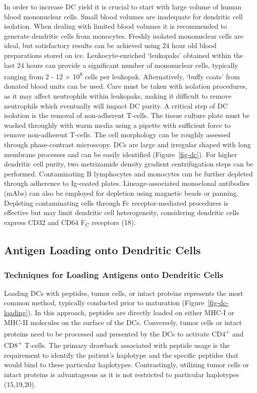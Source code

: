 \documentclass[
]{article}
\begin{document}
In order to increase DC yield it is crucial to start with large volume
of human blood mononuclear cells. Small blood volumes are inadequate for
dendritic cell isolation. When dealing with limited blood volumes it is
recommended to generate dendritic cells from monocytes. Freshly isolated
mononuclear cells are ideal, but satisfactory results can be achieved
using 24 hour old blood preparations stored on ice. Leukocyte-enriched
`leukopaks' obtained within the last 24 hours can provide a significant
number of mononuclear cells, typically ranging from 2 - 12 ×
10\textsuperscript{8} cells per leukopak. Alternatively, `buffy coats'
from donated blood units can be used. Care must be taken with isolation
procedures, as it may affect neutrophils within leukopaks, making it
difficult to remove neutrophils which eventually will impact DC purity.
A critical step of DC isolation is the removal of non-adherent T-cells.
The tissue culture plate must be washed throughly with warm media using
a pipette with sufficient force to remove non-adherent T-cells. The cell
morphology can be roughly assessed through phase-contrast microscopy.
DCs are large and irregular shaped with long membrane processes and can
be easily identified (Figure~\ref{fig-dc}). For higher dendritic cell
purity, two metrizamide density gradient centrifugation steps can be
performed. Contaminating B lymphocytes and monocytes can be further
depleted through adherence to Ig-coated plates. Lineage-associated
monoclonal antibodies (mAbs) can also be employed for depletion using
magnetic beads or panning. Depleting contaminating cells through Fc
receptor-mediated procedures is effective but may limit dendritic cell
heterogeneity, considering dendritic cells express CD32 and CD64
F\textsubscript{C} receptors (18).

\subsection{Antigen Loading onto Dendritic
Cells}\label{antigen-loading-onto-dendritic-cells}

\subsubsection{Techniques for Loading Antigens onto Dendritic
Cells}\label{techniques-for-loading-antigens-onto-dendritic-cells}

Loading DCs with peptides, tumor cells, or intact proteins represents
the most common method, typically conducted prior to maturation
(Figure~\ref{fig-dc-loading}). In this approach, peptides are directly
loaded on either MHC-I or MHC-II molecules on the surface of the DCs.
Conversely, tumor cells or intact proteins need to be processed and
presented by the DCs to activate CD4\textsuperscript{+} and
CD8\textsuperscript{+} T-cells. The primary drawback associated with
peptide usage is the requirement to identify the patient's haplotype and
the specific peptides that would bind to these particular haplotypes.
Contrastingly, utilizing tumor cells or intact proteins is advantageous
as it is not restricted to particular haplotypes (15,19,20).
\end{document}
